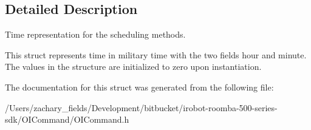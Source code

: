 \subsection{Detailed Description}
Time representation for the scheduling methods. 

This struct represents time in military time with the two fields hour and minute. The values in the structure are initialized to zero upon instantiation. 

The documentation for this struct was generated from the following file\+:\begin{DoxyCompactItemize}
\item 
/\+Users/zachary\+\_\+fields/\+Development/bitbucket/irobot-\/roomba-\/500-\/series-\/sdk/\+O\+I\+Command/O\+I\+Command.\+h\end{DoxyCompactItemize}

